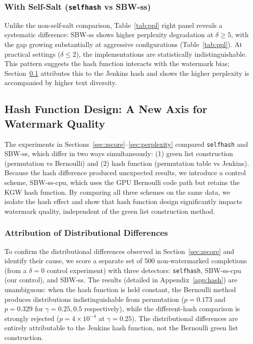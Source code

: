 \documentclass[11pt]{article}
\begin{document}
\subsubsection{With Self-Salt (\texttt{selfhash} vs SBW-ss)}

Unlike the non-self-salt comparison, Table~\ref{tab:ppl} right panel reveals a systematic difference: SBW-ss shows higher perplexity degradation at $\delta \geq 5$, with the gap growing substantially at aggressive configurations (Table~\ref{tab:ppl}). At practical settings ($\delta \leq 2$), the implementations are statistically indistinguishable. This pattern suggests the hash function interacts with the watermark bias; Section~\ref{sec:hash} attributes this to the Jenkins hash and shows the higher perplexity is accompanied by higher text diversity.


\subsection{Hash Function Design: A New Axis for Watermark Quality}
\label{sec:hash}

The experiments in Sections~\ref{sec:zscore}--\ref{sec:perplexity} compared \texttt{selfhash} and SBW-ss, which differ in two ways simultaneously: (1) green list construction (permutation vs Bernoulli) and (2) hash function (permutation table vs Jenkins). Because the hash difference produced unexpected results, we introduce a control scheme, SBW-ss-cpu, which uses the GPU Bernoulli code path but retains the KGW hash function. By comparing all three schemes on the same data, we isolate the hash effect and show that hash function design significantly impacts watermark quality, independent of the green list construction method.

\subsubsection{Attribution of Distributional Differences}
\label{sec:hash_attribution}

To confirm the distributional differences observed in Section~\ref{sec:zscore} and identify their cause, we score a separate set of 500 non-watermarked completions (from a $\delta=0$ control experiment) with three detectors: \texttt{selfhash}, SBW-ss-cpu (our control), and SBW-ss. The results (detailed in Appendix~\ref{app:hash}) are unambiguous: when the hash function is held constant, the Bernoulli method produces distributions indistinguishable from permutation ($p=0.173$ and $p=0.329$ for $\gamma=0.25, 0.5$ respectively), while the different-hash comparison is strongly rejected ($p=4{\times}10^{-4}$ at $\gamma=0.25$). The distributional differences are entirely attributable to the Jenkins hash function, not the Bernoulli green list construction.
\end{document}
